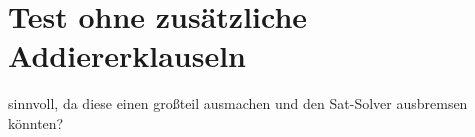 \section{Test ohne zusätzliche Addiererklauseln}

sinnvoll, da diese einen großteil ausmachen und den Sat-Solver ausbremsen könnten?

